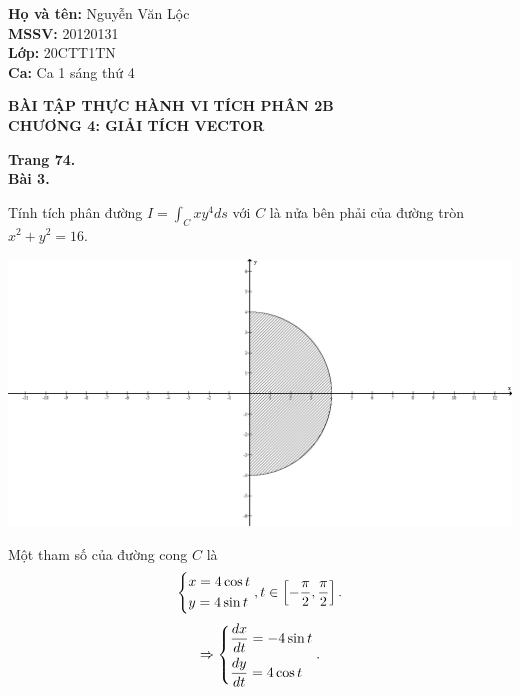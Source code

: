 \documentclass[12pt,a4paper]{article}
\author{Nguyễn Văn Lộc}
\begin{document}
\fancyhf{}
\lhead{}
\chead{}
\rhead{}
\cfoot{\thepage}
\rfoot{}
\lfoot{}
\pagestyle{fancy}
\renewcommand{\headrulewidth}{0pt}
\renewcommand{\footrulewidth}{0pt}
\begin{flushleft}
	\begin{mybox}
	\textbf{Họ và tên:} Nguyễn Văn Lộc\\
	\textbf{MSSV:} 20120131\\ 
	\textbf{Lớp:} 20CTT1TN\\
	\textbf{Ca:} Ca 1 sáng thứ 4
	\end{mybox}
\end{flushleft}
\begin{center}
	\textbf{BÀI TẬP THỰC HÀNH VI TÍCH PHÂN 2B}\\
	\textbf{CHƯƠNG 4: GIẢI TÍCH VECTOR}
\end{center}
\textbf{Trang 74.}\\
\textbf{Bài 3.}
\begin{mybox}
	Tính tích phân đường \(I = \int_C {x{y^4}} ds\) với \(C\) là nửa bên 	phải của đường tròn \({x^2} + {y^2} = 16.\)
\end{mybox}
\begin{center}
	\includegraphics[scale=0.3]{c4_1}
\end{center}
Một tham số của đường cong \(C\) là
\[\left\{ \begin{gathered}
  x = 4\cos t \hfill \\
  y = 4\sin t \hfill \\ 
\end{gathered}  \right.,t \in \left[ { - \frac{\pi }{2},\frac{\pi }{2}} \right].\]
\[ \Rightarrow \left\{ \begin{gathered}
  \frac{{dx}}{{dt}} =  - 4\sin t \hfill \\
  \frac{{dy}}{{dt}} = 4\cos t \hfill \\ 
\end{gathered}  \right..\]
\end{document}
